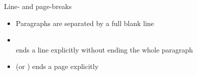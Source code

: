 \documentclass[table]{beamer}
\begin{document}
\begin{frame}[fragile]{Line- and page-breaks}
    \begin{itemize}
        \item Paragraphs are separated by a full blank line

        \item \texttt{\\} ends a line explicitly without ending the whole paragraph

        \item \texttt{\newpage} (or \texttt{\clearpage})
            ends a page explicitly
    \end{itemize}


\end{frame}
\end{document}
